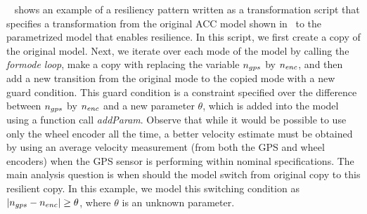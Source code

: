 ~ shows an example of a resiliency pattern written as a transformation script that specifies a transformation from the original ACC model shown in~ to the parametrized model that enables resilience. 
%
In this script, we first create a copy of the original model. Next, we iterate over each mode of the model by calling the \emph{formode loop}, make a copy with replacing the variable $n_{gps}$ by $n_{enc}$, and then add a new transition from the original mode to the copied mode with a new guard condition. This guard condition is a constraint specified over the difference between $n_{gps}$ by $n_{enc}$ and a new parameter $\theta$, which is added into the model using a function call \emph{addParam}.
%
%
Observe that while it would be possible to use only the wheel encoder all the time, a better velocity estimate must be obtained by using an average velocity measurement (from both the GPS and wheel encoders) when the GPS sensor is performing within nominal specifications. The main analysis question is when should the model switch from original copy to this resilient copy.  In this example, we model this switching condition as $|n_{gps} -n_{enc}| \geq \theta$, where $\theta$ is an unknown parameter. 



